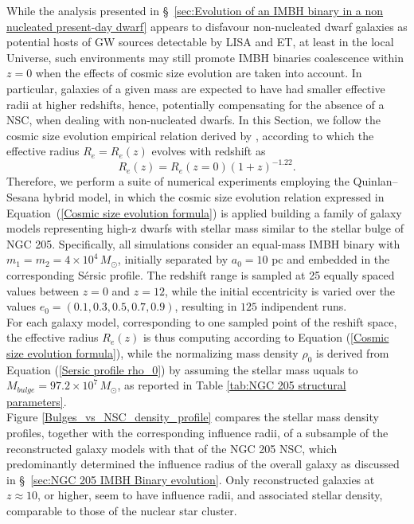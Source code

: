 \documentclass[12pt,twoside,openany]{book}
\begin{document}
While the analysis presented in \S~\ref{sec:Evolution of an IMBH binary in a non nucleated present-day dwarf} appears to disfavour non-nucleated dwarf galaxies as potential hosts of GW sources detectable by LISA and ET, at least in the local Universe, such environments may still promote IMBH binaries coalescence within $z=0$ when the effects of cosmic size evolution are taken into account. In particular, galaxies of a given mass are expected to have had smaller effective radii at higher redshifts, hence, potentially compensating for the absence of a NSC, when dealing with non-nucleated dwarfs. In this Section, we follow the cosmic size evolution empirical relation derived by \textcite{Ono_2023}, according to which the effective radius $R_e=R_e(z)$ evolves with redshift as
\begin{equation}
R_e(z)=R_e(z=0)(1+z)^{-1.22}.
\label{Cosmic size evolution formula}
\end{equation}
Therefore, we perform a suite of numerical experiments employing the Quinlan--Sesana hybrid model, in which the cosmic size evolution relation expressed in Equation~(\ref{Cosmic size evolution formula}) is applied building a family of galaxy models representing high-z dwarfs with stellar mass similar to the stellar bulge of NGC 205. Specifically, all simulations consider an equal-mass IMBH binary with $m_1=m_2=4\times10^4\,M_\odot$, initially separated by $a_0=10$ pc and embedded in the corresponding  Sérsic profile. The redshift range is sampled at 25 equally spaced values between $z=0$ and $z=12$, while the initial eccentricity is varied over the values $e_0=(0.1,0.3,0.5,0.7,0.9)$, resulting in $125$ indipendent runs.\\For each galaxy model, corresponding to one sampled point of the reshift space, the effective radius $R_e(z)$ is thus computing according to Equation (\ref{Cosmic size evolution formula}), while the normalizing mass density $\rho_0$ is derived from Equation (\ref{Sersic profile rho_0}) by assuming the stellar mass uquals to $M_{bulge}=97.2\times 10^7\,M_\odot$, as reported in Table \ref{tab:NGC 205 structural parameters}.\\Figure \ref{Bulges_vs_NSC_density_profile} compares the stellar mass density profiles, together with the corresponding influence radii, of a subsample of the reconstructed galaxy models with that of the NGC 205 NSC, which predominantly determined the influence radius of the overall galaxy as discussed in \S~\ref{sec:NGC 205 IMBH Binary evolution}. Only reconstructed galaxies at $z\approx10$, or higher, seem to have influence radii, and associated stellar density, comparable to those of the nuclear star cluster.
\end{document}
